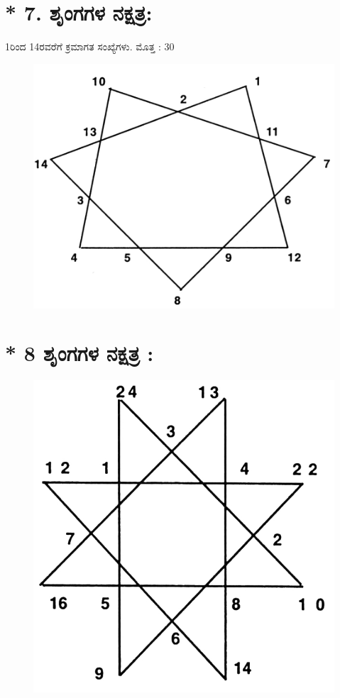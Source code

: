 \section*{* 7. ಶೃಂಗಗಳ ನಕ್ಷತ್ರ:} 

1ರಿಂದ 14ರವರೆಗೆ ಕ್ರಮಾಗತ ಸಂಖ್ಯೆಗಳು. ಮೊತ್ತ : 30
\begin{figure}[H]
\includegraphics[scale=.8]{src/figures/chap8/fig8-5.jpg}
\end{figure}

\section*{* 8 ಶೃಂಗಗಳ ನಕ್ಷತ್ರ :}

\begin{figure}[H]
\includegraphics[scale=.9]{src/figures/chap8/fig8-6.jpg}
\end{figure}

